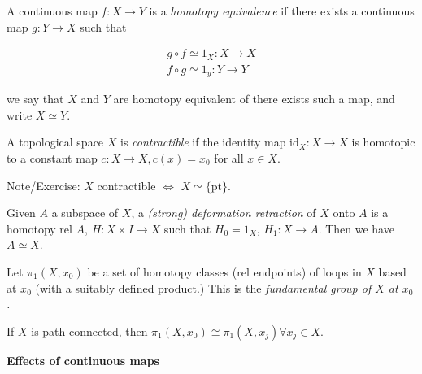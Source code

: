 \begin{defn}
A continuous map $f:X\to Y$ is a \emph{homotopy equivalence} if there
exists a continuous map $g:Y\to X$ such that

\begin{align*}
g\circ f\simeq1_{X}:X\to X\\
f\circ g\simeq1_{y}:Y\to Y
\end{align*}


we say that $X$ and $Y$ are homotopy equivalent of there exists
such a map, and write $X\simeq Y$.
\end{defn}

\begin{defn}
A topological space $X$ is \emph{contractible} if the identity map
$\text{id}_{X}:X\to X$ is homotopic to a constant map $c:X\to X,c(x)=x_{0}$
for all $x\in X$.

Note/Exercise: $X$ contractible $\Leftrightarrow$ $X\simeq\{\text{pt}\}$.
\end{defn}

\begin{defn}
Given $A$ a subspace of $X$, a \emph{(strong) deformation retraction}
of $X$ onto $A$ is a homotopy rel $A$, $H:X\times I\to X$ such
that $H_{0}=1_{X}$, $H_{1}:X\to A$. Then we have $A\simeq X$.
\end{defn}

\begin{defn}
Let $\pi_{1}(X,x_{0})$ be a set of homotopy classes (rel endpoints)
of loops in $X$ based at $x_{0}$ (with a suitably defined product.)
This is the \emph{fundamental group of $X$ at $x_{0}$.}\end{defn}
\begin{thm}
If $X$ is path connected, then $\pi_{1}(X,x_{0})\cong\pi_{1}(X,x_{j})\forall x_{j}\in X$.
\end{thm}


\textbf{Effects of continuous maps}

